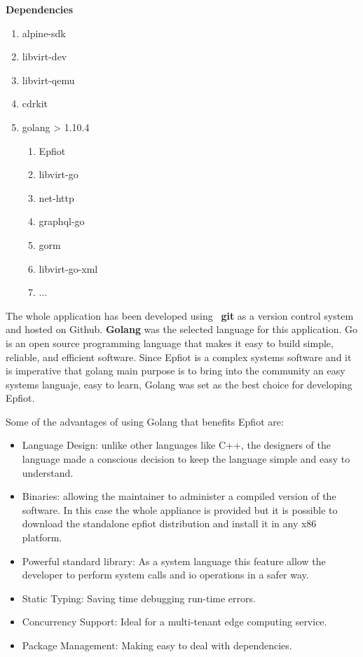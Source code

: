 \newpage
\textbf{Dependencies}

\begin{enumerate}    
  \item alpine-sdk
  \item libvirt-dev
  \item libvirt-qemu
  \item cdrkit
  \item golang > 1.10.4
  \begin{enumerate}
    \item Epfiot
    \item libvirt-go
    \item net-http
    \item graphql-go
    \item gorm
    \item libvirt-go-xml
    \item ...
  \end{enumerate}

\end{enumerate}
The whole application has been developed using ~\textbf{git} as a version control system and hosted on Github. 
\textbf{Golang} was the selected language for this application. Go is an open source programming language that makes it easy to build simple, reliable, and efficient software.
Since Epfiot is a complex systems software and it is imperative that golang main purpose is to bring into the community an easy systems languaje, easy to learn, Golang was set as the best choice for developing Epfiot.

Some of the advantages of using Golang that benefits Epfiot are:

\begin{itemize}
    \item Language Design: unlike other languages like C++, the designers of the language made a conscious decision to keep the language simple and easy to understand.
    \item Binaries: allowing the maintainer to administer a compiled version of the software. In this case the whole appliance is provided but it is possible to download the standalone epfiot distribution and install it in any x86 platform.
    \item Powerful standard library: As a system language this feature allow the developer to perform system calls and io operations in a safer way.
    \item Static Typing: Saving time debugging run-time errors.
    \item Concurrency Support: Ideal for a multi-tenant edge computing service.
    \item Package Management: Making easy to deal with dependencies.
\end{itemize}

